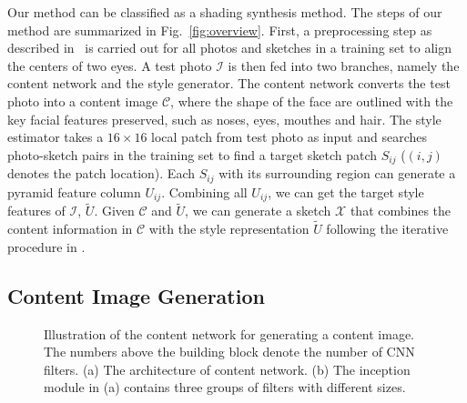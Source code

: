 \documentclass[10pt,twocolumn,letterpaper]{article}
\begin{document}
Our method can be classified as a shading synthesis method. The steps of our method are summarized in Fig.~\ref{fig:overview}. First, a preprocessing step as described in~\cite{wang2009face} is carried out for all photos and sketches in a training set to align the centers of two eyes. A test photo $\mathcal{I}$ is then fed into two branches, namely the content network and the style generator. The content network converts the test photo into a content image $\mathcal{C}$, where the shape of the face are outlined with the key facial features preserved, such as noses, eyes, mouthes and hair. The style estimator takes a $16\times16$ local patch from test photo as input and searches photo-sketch pairs in the training set to find a target sketch patch $S_{ij}$ ($(i, j)$ denotes the patch location). Each  $S_{ij}$ with its surrounding region can generate a pyramid feature column $U_{ij}$. Combining all $U_{ij}$, we can get the target style features of $\mathcal{I}$, \ie $\tilde{U}$. Given $\mathcal{C}$ and $\tilde{U}$, we can generate a sketch $\mathcal{X}$ that combines the content information in $\mathcal{C}$ with the style representation $\tilde{U}$ following the iterative procedure in \cite{gatys2015neural}. 

\subsection{Content Image Generation} \label{sec:content_net}
\begin{figure}[htbp]
\centering
{}
\caption{Illustration of the content network for generating a content image. The numbers above the building block denote the number of CNN filters. (a) The architecture of content network. (b) The inception module in (a) contains three groups of filters with different sizes.}
\label{fig:content_NN}
\end{figure}
\end{document}
